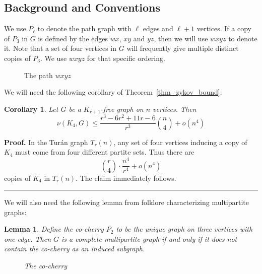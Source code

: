 \documentclass[12pt]{article}
\newtheorem{lemma}[thm]{Lemma}
\newtheorem{cor}[thm]{Corollary}
\renewenvironment{proof}[1][Proof]{\textbf{#1.} }{\ \rule{0.5em}{0.5em}}
\begin{document}
\subsection{Background and Conventions}

We use $P_\ell$ to denote the path graph with $\ell$ edges and $\ell+1$
vertices. If a copy of $P_3$ in $G$ is defined by the edges $wx$, $xy$ and $yz$,
then we will use $wxyz$ to denote it. Note that a set of four
vertices in $G$ will frequently give multiple distinct copies of $P_3$. We use $wxyz$ for
that specific ordering. 

\begin{figure}[H]
    \centering
    \caption{The path $wxyz$}
\end{figure}

We will need the following corollary of Theorem~\ref{thm_zykov_bound}:
\begin{cor}\label{cor_zykov_bound}
Let $G$ be a $K_{r+1}$-free graph on $n$ vertices. Then 
\[\nu(K_4,G) \leq \frac{r^3 - 6r^2 + 11r - 6}{r^3}\binom{n}{4} + o(n^4)\]
\end{cor}
\begin{proof}
In the Tur\'{a}n graph $T_r(n)$, any set of four vertices inducing a copy of $K_4$ must come from four different partite sets. Thus there are
\[ \binom{r}{4} \cdot \frac{n^4}{r^4} + o(n^4) \]
copies of $K_4$ in $T_r(n)$. The claim immediately follows. 
\end{proof}

We will also need the following lemma from folklore characterizing multipartite graphs:

\begin{lemma}\label{lem:multipartite_characterization}
Define the \emph{co-cherry} $\overline{P_2}$ to be the unique graph on three
vertices with one edge. Then $G$ is a complete multipartite graph if and only if
it does not contain the co-cherry as an induced subgraph.
\begin{figure}[H]
    \centering
    \caption{The co-cherry}
\end{figure}
\end{lemma}
\end{document}
